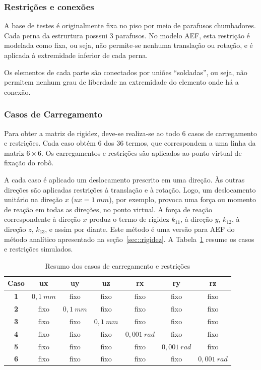 \subsubsection{Restrições e conexões}

A base de testes é originalmente fixa no piso por meio de parafusos chumbadores.
Cada perna da estrurtura posssui 3 parafusos. No modelo AEF, esta restrição é
modelada como fixa, ou seja, não permite-se nenhuma translação ou rotação, e
é aplicada à extremidade inferior de cada perna.

Os elementos de cada parte são conectados por uniões ``soldadas'', ou seja, não
permitem nenhum grau de liberdade na extremidade do elemento onde há a conexão.


\subsubsection{Casos de Carregamento}

Para obter a matriz de rigidez, deve-se realiza-se ao todo 6 casos de
carregamento e restrições. Cada caso obtém 6 dos 36 termos, que correspondem a uma linha
da matriz $6 \times 6$. Os carregamentos e restrições são aplicados ao ponto
virtual de fixação do robô.

A cada caso é aplicado um deslocamento prescrito em uma direção. Às outras
direções são aplicadas restrições à translação e à rotação. Logo, um
deslocamento unitário na direção $x$ ($ux = 1~mm$), por exemplo, provoca uma
força ou momento de reação em todas as direções, no ponto virtual. A força de
reação correspondente à direção $x$ produz o termo de rigidez $k_{11}$, à
direção $y$, $k_{12}$, à direção $z$, $k_{13}$, e assim por diante. Este método
é uma versão para AEF do método analítico apresentado na
seção~\ref{sec::rigidez}. A Tabela~\ref{tab::casoscarreg} resume os casos e
restrições simulados.

\begin{table}[h]
\centering
\caption{Resumo dos casos de carregamento e restrições}
\label{tab::casoscarreg}
\begin{tabular}{@{}ccccccc@{}}
\toprule
\textbf{Caso} & \textbf{ux} & \textbf{uy} & \textbf{uz} & \textbf{rx} & \textbf{ry} & \textbf{rz} \\ \midrule
\textbf{1}    & $0,1~mm$           & fixo        & fixo        & fixo        &
fixo & fixo        \\
\textbf{2}    & fixo        & $0,1~mm$            & fixo        & fixo        &
fixo        & fixo        \\
\textbf{3}    & fixo        & fixo        & $0,1~mm$            & fixo        &
fixo        & fixo        \\
\textbf{4}    & fixo        & fixo        & fixo        & $0,001~rad$           
& fixo        & fixo        \\
\textbf{5}    & fixo        & fixo        & fixo        & fixo        &
$0,001~rad$            & fixo        \\
\textbf{6}    & fixo        & fixo        & fixo        & fixo        & fixo    
& $0,001~rad$            \\ \bottomrule
\end{tabular}
\end{table}


